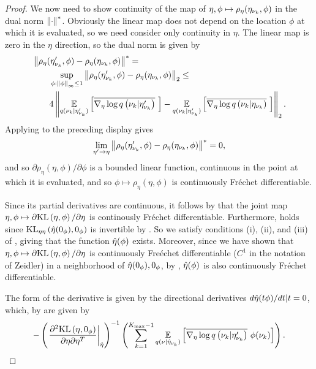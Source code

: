 \begin{thm}
\begin{proof}
We now need to show continuity of the map of $\eta, \phi \mapsto
\rho_\eta(\eta_{\nu_{k}}, \phi)$ in the dual norm $\left\Vert\cdot\right\Vert^*$.  Obviously the
linear map does not depend on the location $\phi$ at which it is evaluated, so
we need consider only continuity in $\eta$.  The linear map is zero in the
$\eta$ direction, so the dual norm is given by
%
\begin{align*}
%
\MoveEqLeft
\norm{\rho_\eta(\etanuk', \phi) - \rho_\eta(\etanuk, \phi)}^* ={}\\&
\sup_{\phi: \norminf{\phi} \le 1}
    \norm{\rho_\eta(\etanuk', \phi) - \rho_\eta(\etanuk, \phi)}_2 \le{}\\&
4 \norm{
    \expect{\q(\nuk \vert \etanuk')}{\lqgradbar{\nuk \vert \etanuk'}} -
    \expect{\q(\nuk \vert \etanuk')}{\lqgradbar{\nuk \vert \etanuk}}
}_2.
%
\end{align*}
%
Applying  to the preceding display gives
%
\begin{align*}
%
\lim_{\eta' \rightarrow \eta}
    \norm{\rho_\eta(\etanuk', \phi) - \rho_\eta(\etanuk, \phi)}^* = 0,
%
\end{align*}
%
and so $\partial \rho_\eta(\eta, \phi) / \partial \phi$ is a bounded linear
function, continuous in the point at which it is evaluated, and so $\phi \mapsto
\rho_\eta(\eta, \phi)$ is continuously Fr{\'e}chet differentiable.

Since its partial derivatives are continuous, it follows by \citet[Proposition
4.14(c)]{zeidler:2013:functional} that the joint map $\eta, \phi \mapsto
\partial \mathrm{KL}\left(\eta, \phi\right) / \partial \eta$ is continously Fr{\'e}chet
differentiable.  Furthermore, \citet[Chapter 4 Condition
21b]{zeidler:2013:functional} holds since $\mathrm{KL}_{\eta\eta}\left(\hat\eta(0_\phi), 0_\phi\right)$ is
invertible by .   So we satisfy conditions (i),
(ii), and (iii) of \citet[Theorem 4.B(c)]{zeidler:2013:functional}, giving that
the function $\hat\eta(\phi)$ exists.  Moreover, since we have shown that $\eta,
\phi \mapsto \partial \mathrm{KL}\left(\eta, \phi\right) / \partial \eta$ is continuously
Fre{\'e}chet differentiable ($C^1$ in the notation of Zeidler) in a neighborhood
of $\hat\eta(0_\phi), 0_\phi$, by \citet[Theorem 4.B(d)]{zeidler:2013:functional},
$\hat\eta(\phi)$ is also continuously Fr{\'e}chet differentiable.

The form of the derivative is given by the directional derivatives
$d \hat\eta(t \phi) / dt | t = 0$, which, by  are given
by
%
\begin{align*}
%
-\left(\fracat{\partial^2 \KL{\eta, \phiz}}
                {\partial \eta \partial \eta^T}
                {\etaopt}\right)^{-1}
\left(
    \sumkm \expect{\q(\nu \vert \etaoptnuk)}{\lqgradbar{\nuk \vert \etanuk'} \phi(\nuk)}
\right).
%
\end{align*}
%
\end{proof}
%
\end{thm}
%
